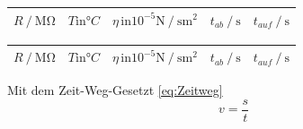 \begin{table}[H]
\begin{minipage}[t]{1\textwidth}
\begin{table}[H]
\begin{tabular}{S S S S S}
              \bottomrule
            \end{tabular}
          \end{table}
        
    \end{minipage}\qquad
    \begin{minipage}[t]{1\textwidth}
        \small
        \label{stab:v225}
        \begin{table}[H]
            \centering
            \begin{tabular}{S S S S S}
              \toprule
                {$R \mathbin{/} \unit{\mega\ohm} $} & {$T \text{in} °C $} & {$\eta \, \text{in} 10^{-5} \unit{\newton}\mathbin{/} \unit{\second\meter}^2$}&{$ t_{ab} \mathbin{/} \unit{\second}$} & {$ t_{auf} \mathbin{/} \unit{\second}$}\\
              \midrule
              
              \bottomrule
            \end{tabular}
          \end{table}
        
    \end{minipage}\qquad
    \begin{minipage}[t]{1\textwidth}
        \small
        \label{stab:v250}
        \begin{table}[H]
            \centering
            \begin{tabular}{S S S S S}
              \toprule
                {$R \mathbin{/} \unit{\mega\ohm} $} & {$T \text{in} °C $} & {$\eta \, \text{in} 10^{-5} \unit{\newton}\mathbin{/} \unit{\second\meter}^2$}&{$ t_{ab} \mathbin{/} \unit{\second}$} & {$ t_{auf} \mathbin{/} \unit{\second}$}\\
              \midrule
              
              \bottomrule
            \end{tabular}
          \end{table}
    \end{minipage}
\end{table}
Mit dem Zeit-Weg-Gesetzt \eqref{eq:Zeitweg}
\begin{equation*}
  v = \dfrac{s}{t}
  \label{eq:Zeitweg}
\end{equation*}

